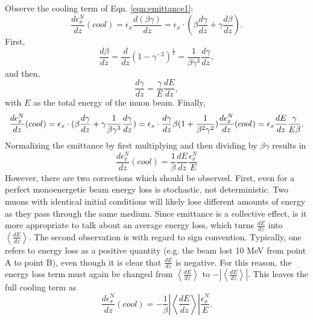 Observe the cooling term of Eqn. \ref{eqn:emittance1}:
\begin{equation} \nonumber
\frac{d\epsilon_x^N}{dz}(cool)=\epsilon_x\frac{d(\beta\gamma)}{dz}=\epsilon_x\cdot(\beta\frac{d\gamma}{dz}+\gamma\frac{d\beta}{dz}).
\end{equation}
First,
\begin{equation} \nonumber
\frac{d\beta}{dz}=\frac{d}{dz}(1-\gamma^{-2})^{\frac{1}{2}}=\frac{1}{\beta\gamma^3}\frac{d\gamma}{dz},
\end{equation}
and then,
\begin{equation} \nonumber
\frac{d\gamma}{dz}=\frac{\gamma}{E}\frac{dE}{dz},
\end{equation}
with $E$ as the total energy of the muon beam. Finally,
\begin{equation} \nonumber
\frac{d\epsilon_x^N}{dz}(cool)=\epsilon_x\cdot(\beta\frac{d\gamma}{dz}+\gamma\frac{1}{\beta\gamma^3}\frac{d\gamma}{dz})=\epsilon_x\cdot\frac{d\gamma}{dz}\beta(1+\frac{1}{\beta^2\gamma^2}) \vspace*{12pt}
\frac{d\epsilon_x^N}{dz}(cool)=\epsilon_x\frac{dE}{dz}\frac{\gamma}{E\beta}.
\end{equation}
Normalizing the emittance by first multiplying and then dividing by $\beta\gamma$ results in
\begin{equation} \nonumber
\frac{d\epsilon_x^N}{dz}(cool)=\frac{1}{\beta}\frac{dE}{dz}\frac{\epsilon_x^N}{E}
\end{equation}
However, there are two corrections which should be observed. First, even for a perfect monoenergetic beam energy loss is stochastic, not deterministic. Two muons with identical initial conditions will likely lose different amounts of energy as they pass through the same medium. Since emittance is a collective effect, is it more appropriate to talk about an average energy loss, which turns $\frac{dE}{dz}$ into $\left<\frac{dE}{dz}\right>$. The second observation is with regard to sign convention. Typically, one refers to energy loss as a positive quantity (e.g. the beam lost 10 MeV from point A to point B), even though it is clear that $\frac{dE}{dz}$ is negative. For this reason, the energy loss term must again be changed from $\left<\frac{dE}{dz}\right>$ to  $-\left|\left<\frac{dE}{dz}\right>\right|$. This leaves the full cooling term as
\begin{equation}
\label{eqn:emittancecool}
\frac{d\epsilon_x^N}{dz}(cool)=-\frac{1}{\beta}\left| \left<\frac{dE}{dz}\right>\right| \frac{\epsilon_x^N}{E}.
\end{equation}

